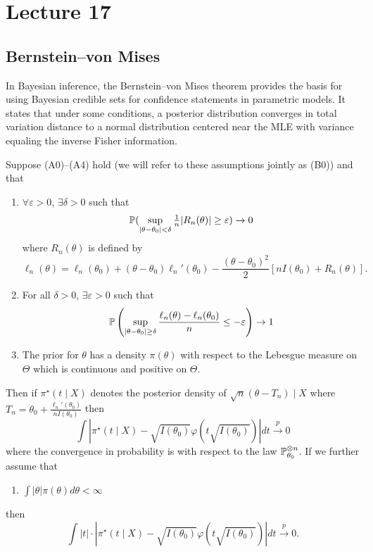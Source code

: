 \newpage

\section{Lecture 17}

\subsection{Bernstein–von Mises}

In Bayesian inference, the Bernstein–von Mises theorem provides the basis for using Bayesian credible sets for confidence statements in parametric models. It states that under some conditions, a posterior distribution converges in total variation distance to a normal distribution centered near the MLE with variance equaling the inverse Fisher information.

\begin{theorem}
	Suppose (A0)--(A4) hold (we will refer to these assumptions jointly as (B0)) and that \begin{enumerate}
	\item[(B1)] $\forall \varepsilon > 0$, $\exists \delta > 0$ such that \[
		\mathbb{P}(\sup_{|\theta - \theta_0| < \delta} \tfrac{1}{n} |R_n(\theta)| \geq \varepsilon) \to 0
	\] where $R_n(\theta)$ is defined by \[
		\ell_n(\theta) = \ell_n(\theta_0) + (\theta - \theta_0) \ell_n'(\theta_0) - \frac{(\theta - \theta_0)^2}{2} [nI(\theta_0) + R_n(\theta)].
	\] 
	
	\item[(B2)] For all $\delta > 0$, $\exists \varepsilon > 0$ such that \[
		\mathbb{P}\left(\sup_{|\theta - \theta_0| \geq \delta} \frac{\ell_n(\theta) - \ell_n(\theta_0)}{n} \leq -\varepsilon \right) \to 1
	\]
	
	\item[(B3)] The prior for $\theta$ has a density $\pi(\theta)$ with respect to the Lebesgue measure on $\Theta$ which is continuous and positive on $\Theta$. 	
	\end{enumerate}
	
	\noindent Then if $\pi^\star(t \mid X)$ denotes the posterior density of $\sqrt{n} (\theta - T_n) \mid X$ where $T_n = \theta_0 + \frac{\ell_n'(\theta_0)}{nI(\theta_0)}$ then \[
	\int \left|\pi^\star(t \mid X) - \sqrt{I(\theta_0)} \varphi(t\sqrt{I(\theta_0)}) \right| dt \overset{p}{\to} 0
	\] where the convergence in probability is with respect to the law $\mathbb{P}^{\otimes n}_{\theta_0}$. If we further assume that
	
	 \begin{enumerate}
		\item[(B4)] $\int |\theta| \pi(\theta) d\theta < \infty$
	\end{enumerate}
	then \[
		\int |t| \cdot \left|\pi^\star(t \mid X) - \sqrt{I(\theta_0)} \varphi(t\sqrt{I(\theta_0)}) \right| dt \overset{p}{\to} 0.
	\]
\end{theorem}

